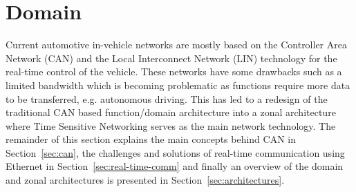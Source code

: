 \section{Domain}
\label{sec:domain}
Current automotive in-vehicle networks are mostly based on the Controller Area Network (CAN) and the Local Interconnect Network (LIN) technology for the real-time control of the vehicle. These networks have some drawbacks such as a limited bandwidth which is becoming problematic as functions require more data to be transferred, e.g. autonomous driving. This has led to a redesign of the traditional CAN based function/domain architecture into a zonal architecture where Time Sensitive Networking serves as the main network technology. The remainder of this section explains the main concepts behind CAN in Section~\ref{sec:can}, the challenges and solutions of real-time communication using Ethernet in Section~\ref{sec:real-time-comm} and finally an overview of the domain and zonal architectures is presented in Section~\ref{sec:architectures}.




